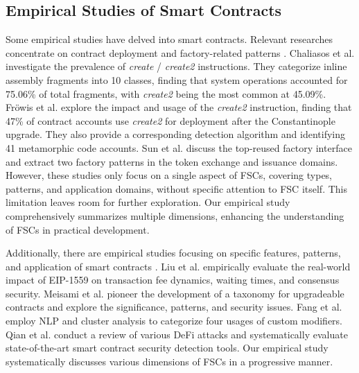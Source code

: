 \documentclass[acmsmall,screen]{acmart}
\begin{document}
	\subsection{Empirical Studies of Smart Contracts} Some empirical studies have delved into smart contracts. Relevant researches concentrate on contract deployment \cite{DBLP:journals/pacmpl/ChaliasosGL22,DBLP:conf/fc/FrowisB22} and factory-related patterns \cite{DBLP:conf/sigsoft/SunXLLL23,DBLP:conf/fc/SalehiCM22}. Chaliasos et al. \cite{DBLP:journals/pacmpl/ChaliasosGL22} investigate the prevalence of \textit{create} / \textit{create2} instructions. They categorize inline assembly fragments into 10 classes, finding that system operations accounted for 75.06\% of total fragments, with \textit{create2} being the most common at 45.09\%. Fröwis et al. \cite{DBLP:conf/fc/FrowisB22} explore the impact and usage of the \textit{create2} instruction, finding that 47\% of contract accounts use \textit{create2} for deployment after the Constantinople upgrade. They also provide a corresponding detection algorithm and identifying 41 metamorphic code accounts. Sun et al. \cite{DBLP:conf/sigsoft/SunXLLL23} discuss the top-reused factory interface and extract two factory patterns in the token exchange and issuance domains. However, these studies only focus on a single aspect of FSCs, covering types, patterns, and application domains, without specific attention to FSC itself. This limitation leaves room for further exploration. Our empirical study comprehensively summarizes multiple dimensions, enhancing the understanding of FSCs in practical development.

	Additionally, there are empirical studies focusing on specific features, patterns, and application of smart contracts \cite{DBLP:conf/uss/BodellMD23,DBLP:journals/corr/abs-2309-02391,DBLP:journals/tse/LiaoSZLHJCCZZ23,DBLP:conf/dsn/FynnBP20,DBLP:conf/issta/FangWYWCCLJ23,DBLP:conf/icse/YinZNWWLLG22,10.1145/3548606.3559341}. Liu et al. \cite{10.1145/3548606.3559341} empirically evaluate the real-world impact of EIP-1559 on transaction fee dynamics, waiting times, and consensus security. Meisami et al. \cite{DBLP:conf/uss/BodellMD23} pioneer the development of a taxonomy for upgradeable contracts and explore the significance, patterns, and security issues. Fang et al. \cite{DBLP:conf/issta/FangWYWCCLJ23} employ NLP and cluster analysis to categorize four usages of custom modifiers. Qian et al. \cite{DBLP:journals/corr/abs-2309-02391} conduct a review of various DeFi attacks and systematically evaluate state-of-the-art smart contract security detection tools. Our empirical study systematically discusses various dimensions of FSCs in a progressive manner.
\end{document}
